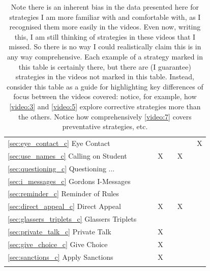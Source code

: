 \documentclass[12pt]{report}
\begin{document}
\begin{longtable}{l|c|c|c|c|c|c|c|}
\ref{sec:eye_contact_c} Eye Contact                                & & & & & & &X\\
\ref{sec:use_names_c} Calling on Student                                  & & &X& &X& & \\
\ref{sec:questioning_c} Questioning ...                                & & & & & & & \\
\ref{sec:i_messages_c} Gordons I-Messages                                 & & & & & & & \\
\ref{sec:reminder_c} Reminder of Rules                                   & & & & & & & \\
\ref{sec:direct_appeal_c} Direct Appeal                              & & &X& &X& & \\
\ref{sec:glassers_triplets_c} Glassers Triplets                          & & & & & & & \\
\ref{sec:private_talk_c} Private Talk                               & & &X& & & & \\
\ref{sec:give_choice_c} Give Choice                                & & &X& & & & \\
\ref{sec:sanctions_c} Apply Sanctions                                  & & &X& & & & \\
\hline 
\caption{Note there is an inherent bias in the data presented here for strategies I am more familiar with and comfortable with, as I recognised them more easily in the videos. Even now, writing this, I am still thinking of strategies in these videos that I missed. So there is no way I could realistically claim this is in any way comprehensive. Each example of a strategy marked in this table is certainly there, but there are (I guarantee) strategies in the videos not marked in this table. Instead, consider this table as a guide for highlighting key differences of focus between the videos covered: notice, for example, how \ref{video:3} and \ref{video:5} explore corrective strategies more than the others. Notice how comprehensively \ref{video:7} covers preventative strategies, etc.
\label{tab:videos}}

\end{longtable}
\end{document}
